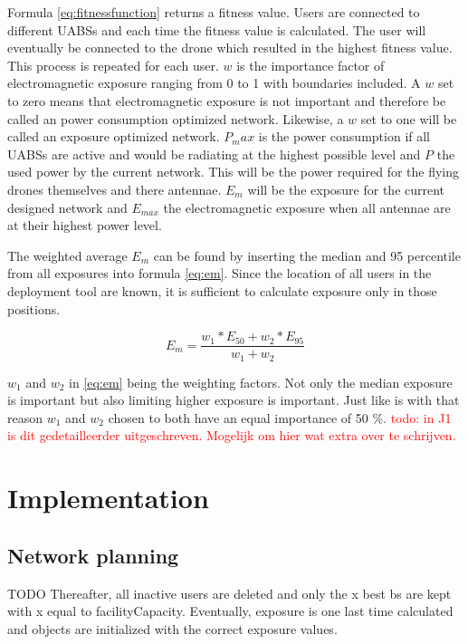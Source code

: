 Formula \ref{eq:fitnessfunction} returns a fitness value. Users are connected to different \gls{UABS}s and each time the fitness value is 
calculated. The user will eventually be connected to the drone which resulted in the highest fitness value. This process is repeated for each user.
$w$ is the importance factor of electromagnetic exposure ranging from 0 to 1 with boundaries included. A $w$ set to zero means that electromagnetic 
exposure is not important and therefore be called an power consumption optimized network. Likewise, a $w$ set to one will be called an exposure optimized 
network. $P_max$ is the power consumption if all \gls{UABS}s are active and would be radiating at the highest possible level and $P$ the used power by the current network. 
This will be the power required for the flying drones themselves and there antennae.
$E_m$ will be the exposure for the current designed network and $E_{max}$ the electromagnetic exposure when all antennae are at their highest power level.

The weighted average $E_m$ can be found by inserting the median and 95 percentile from all exposures into formula \ref{eq:em}. Since the location of all users in 
the deployment tool are known, it is sufficient to calculate exposure only in those positions. 

\begin{equation} 
E_m = \frac{w_1 * E_{50} + w_2 * E_{95}}{w_1 + w_2}
\label{eq:em}
\end{equation}

$w_1$ and $w_2$ in \ref{eq:em} being the weighting factors. Not only the median exposure is important but also limiting higher exposure is important. 
Just like \cite{J1} is with that reason $w_1$ and $w_2$ chosen to both have an equal importance of 50 \%.
\textcolor{red}{todo: in J1 is dit gedetailleerder uitgeschreven. Mogelijk om hier wat extra over te schrijven.}


\section{Implementation}

\subsection{Network planning}
TODO
Thereafter, all inactive users are deleted and only the x best bs are kept with x equal to facilityCapacity.
Eventually, exposure is one last time calculated and objects are initialized with the correct exposure values.


